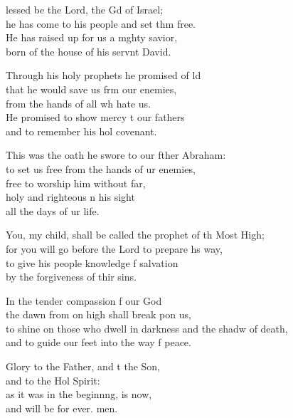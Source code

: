 \begin{psalmverse}
  \begin{patverse}
lessed be the Lord, the Gd of Israel;\Med\\
he has come to his people and set thm free.\\
He has raised up for us a m\pointup{\i}ghty savior,\Med\\
born of the house of his servnt David.

Through his holy prophets he promised of ld\Flex\\
that he would save us frm our enemies,\Med\\
from the hands of all wh hate us.\\
He promised to show mercy t our fathers\Med\\
and to remember his hol covenant.

This was the oath he swore to our fther Abraham:\Med\\
to set us free from the hands of ur enemies,\\
free to worship him without far,\Flex\\
holy and righteous \pointup{\i}n his sight\Med\\
all the days of ur life.

You, my child, shall be called the prophet of th Most High;\Med\\
for you will go before the Lord to prepare h\pointup{\i}s way,\\
to give his people knowledge f salvation\Med\\
by the forgiveness of thir sins.

In the tender compassion f our God\Med\\
the dawn from on high shall break pon us,\\
to shine on those who dwell in darkness and the shadw of death,\Med\\
and to guide our feet into the way f peace.

Glory to the Father, and t the Son,\Med\\
and to the Hol Spirit:\\
as it was in the beginn\pointup{\i}ng, is now,\Med\\
and will be for ever. men.
  \end{patverse}
  \end{psalmverse}
